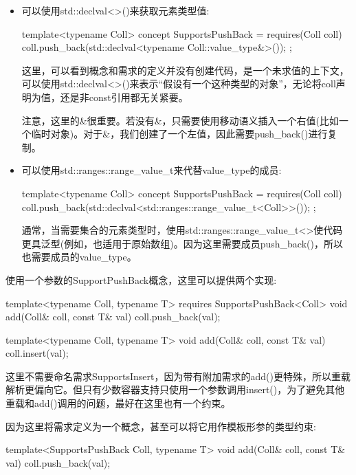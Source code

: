 \begin{itemize}
\item
可以使用std::declval<>()来获取元素类型值:

\begin{cpp}
template<typename Coll>
concept SupportsPushBack = requires(Coll coll) {
	coll.push_back(std::declval<typename Coll::value_type&>());
};
\end{cpp}

这里，可以看到概念和需求的定义并没有创建代码，是一个未求值的上下文，可以使用std::declval<>()来表示“假设有一个这种类型的对象”，无论将coll声明为值，还是非const引用都无关紧要。

注意，这里的\&很重要。若没有\&，只需要使用移动语义插入一个右值(比如一个临时对象)。对于\&，我们创建了一个左值，因此需要push\_back()进行复制。

\item
可以使用std::ranges::range\_value\_t来代替value\_type的成员:

\begin{cpp}
template<typename Coll>
concept SupportsPushBack = requires(Coll coll) {
	coll.push_back(std::declval<std::ranges::range_value_t<Coll>>());
};
\end{cpp}

通常，当需要集合的元素类型时，使用std::ranges::range\_value\_t<>使代码更具泛型(例如，也适用于原始数组)。因为这里需要成员push\_back()，所以也需要成员的value\_type。

\end{itemize}

使用一个参数的SupportPushBack概念，这里可以提供两个实现:

\begin{cpp}
template<typename Coll, typename T>
requires SupportsPushBack<Coll>
void add(Coll& coll, const T& val)
{
	coll.push_back(val);
}

template<typename Coll, typename T>
void add(Coll& coll, const T& val)
{
	coll.insert(val);
}
\end{cpp}

这里不需要命名需求SupportsInsert，因为带有附加需求的add()更特殊，所以重载解析更偏向它。但只有少数容器支持只使用一个参数调用insert()，为了避免其他重载和add()调用的问题，最好在这里也有一个约束。

因为这里将需求定义为一个概念，甚至可以将它用作模板形参的类型约束:

\begin{cpp}
template<SupportsPushBack Coll, typename T>
void add(Coll& coll, const T& val)
{
	coll.push_back(val);
}
\end{cpp}

